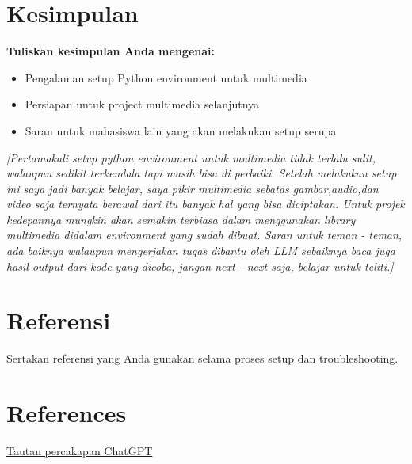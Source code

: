 \documentclass[11pt,a4paper]{article}
\begin{document}
\section{Kesimpulan}
\textbf{Tuliskan kesimpulan Anda mengenai:}
\begin{itemize}
    \item Pengalaman setup Python environment untuk multimedia
    \item Persiapan untuk project multimedia selanjutnya
    \item Saran untuk mahasiswa lain yang akan melakukan setup serupa
\end{itemize}

\textit{[Pertamakali setup python environment untuk multimedia tidak terlalu sulit, walaupun sedikit terkendala tapi masih bisa di perbaiki. Setelah melakukan setup ini saya jadi banyak belajar, saya pikir multimedia sebatas gambar,audio,dan video saja ternyata berawal dari itu banyak hal yang bisa diciptakan. Untuk projek kedepannya mungkin akan semakin terbiasa dalam menggunakan library multimedia didalam environment yang sudah dibuat. Saran untuk teman - teman, ada baiknya walaupun mengerjakan tugas dibantu oleh LLM sebaiknya baca juga hasil output dari kode yang dicoba, jangan next - next saja, belajar untuk teliti.]}

\section{Referensi}
Sertakan referensi yang Anda gunakan selama proses setup dan troubleshooting.

\newpage
\section*{References}

\href{https://chatgpt.com/share/68c587f0-781c-8008-981b-2cf9426bd8cd}{Tautan percakapan ChatGPT}
\end{document}
